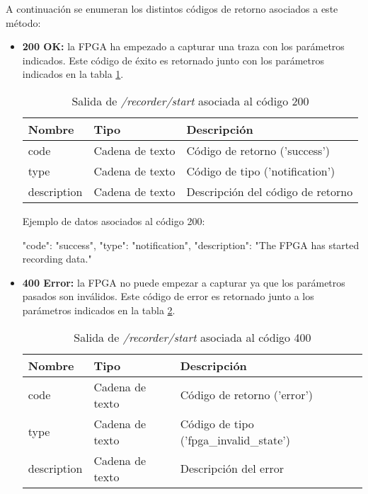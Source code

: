 A continuación se enumeran los distintos códigos de retorno asociados a este método:
\begin{itemize}

\item{\textbf{200 OK:} la \gls{FPGA} ha empezado a capturar una traza con los parámetros indicados. Este código de éxito es retornado junto con los parámetros indicados en la tabla \ref{extra:api:recorderstart:ok}.
\begin{table}[H]
\centering
\begin{tabular}{|l|l|l|}
\hline
\rowcolor[HTML]{F5F5F5}
\textbf{Nombre}  & \textbf{Tipo}   & \textbf{Descripción}              \\ \hline
code             & Cadena de texto & Código de retorno ('success')     \\ \hline
type             & Cadena de texto & Código de tipo ('notification')   \\ \hline
description      & Cadena de texto & Descripción del código de retorno \\ \hline
\end{tabular}
\caption{Salida de \textit{/recorder/start} asociada al código 200}
\label{extra:api:recorderstart:ok}
\end{table}
\begin{minipage}{\textwidth}
Ejemplo de datos asociados al código 200:

\begin{code}[language=json]
{
  "code": "success",
  "type": "notification",
  "description": "The FPGA has started recording data."
}
\end{code}
\end{minipage}
}

\item{\textbf{400 Error:} la \gls{FPGA} no puede empezar a capturar ya que los parámetros pasados son inválidos. Este código de error es retornado junto a los parámetros indicados en la tabla \ref{extra:api:recorderstart:error400}.
\begin{table}[H]
\centering
\begin{tabular}{|l|l|l|}
\hline
\rowcolor[HTML]{F5F5F5}
\textbf{Nombre}  & \textbf{Tipo}   & \textbf{Descripción}                    \\ \hline
code             & Cadena de texto & Código de retorno ('error')             \\ \hline
type             & Cadena de texto & Código de tipo ('fpga\_invalid\_state') \\ \hline
description      & Cadena de texto & Descripción del error                   \\ \hline
\end{tabular}
\caption{Salida de \textit{/recorder/start} asociada al código 400}
\label{extra:api:recorderstart:error400}
\end{table}

}
\end{itemize}
